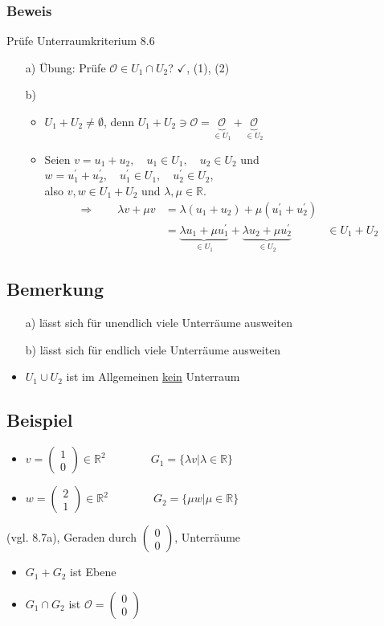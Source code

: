 \documentclass[12pt, titlepage]{article}
\newcommand{\R}{\mathds{R}}
\renewcommand{\vec}[1]{\left(\begin{array}{c}#1
	\end{array}\right)}
\renewcommand{\O}{\mathcal{O}}
\renewcommand{\>}{\rightarrow}
\renewcommand{\*}{\cdot}
\begin{document}
	\subsubsection*{Beweis}
	Prüfe Unterraumkriterium 8.6
	\begin{itemize}
		\item[a)] Übung: Prüfe $\O\in U_1\cap U_2$? $\checkmark$, (1), (2)
		\item[b)] \begin{itemize}
			\item $U_1+U_2\neq\emptyset$, denn $U_1+U_2\ni\O=\underbrace{\O}_{\in U_1}+\underbrace{\O}_{\in U_2}$
			\item Seien $v=u_1+u_2, \quad u_1\in U_1,\quad u_2\in U_2$ und\\
			$w=u_1^\prime+u_2^\prime,\quad u_1^\prime\in U_1,\quad u_2^\prime\in U_2$,\\
			also $v,w\in U_1+U_2$ und $\lambda,\mu\in\R$.\\
			\begin{align*}
				\Rightarrow\qquad\lambda v+\mu v&=\lambda(u_1+u_2)+\mu(u_1^\prime+u_2^\prime)\\
				&=\underbrace{\lambda u_1+\mu u_1^\prime}_{\in U_1}+\underbrace{\lambda u_2+\mu u_2^\prime}_{\in U_2}
				&\in U_1+U_2
			\end{align*}
		\end{itemize}
	\end{itemize}
	\subsection{Bemerkung}
	\begin{itemize}
		\item[a)] lässt sich für unendlich viele Unterräume ausweiten
		\item[b)] lässt sich für endlich viele Unterräume ausweiten
		\item $U_1\cup U_2$ ist im Allgemeinen \underline{kein} Unterraum
	\end{itemize}
	\subsection{Beispiel}
	\begin{itemize}
		\item $v=\vec{1\\0}\in\R^2\qquad\qquad G_1=\{\lambda v|\lambda\in\R\}$
		\item $w=\vec{2\\1}\in\R^2\qquad\qquad G_2=\{\mu w|\mu\in\R\}$
	\end{itemize}
	(vgl. 8.7a), Geraden durch $\vec{0\\0}$, Unterräume
	\begin{itemize}
		\item $G_1+G_2$ ist Ebene
		\item $G_1\cap G_2$ ist $\O=\vec{0\\0}$
	\end{itemize}
\end{document}
